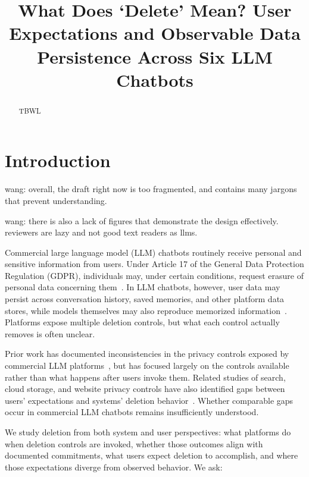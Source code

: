 \documentclass[conference,compsoc]{IEEEtran}
\title{What Does `Delete' Mean? User Expectations and Observable Data Persistence Across Six LLM Chatbots}
\author{\IEEEauthorblockN{Anonymous Author(s)}
\IEEEauthorblockA{Submission \#XXX}}
\newcommand{\xw}[1] {{\color{red}wang: #1}}
\begin{document}
\maketitle

\begin{abstract}
TBWL
\end{abstract}

\section{Introduction}
\label{sec:intro}

\xw{overall, the draft right now is too fragmented, and contains many jargons that prevent understanding.}

\xw{there is also a lack of figures that demonstrate the design effectively. reviewers are lazy and not good text readers as llms.}

Commercial large language model (LLM) chatbots routinely receive personal
and sensitive information from users. Under Article 17 of the General Data
Protection Regulation (GDPR), individuals may, under certain conditions,
request erasure of personal data concerning them~\cite{gdpr2016}. In LLM
chatbots, however, user data may persist across conversation history,
saved memories, and other platform data stores, while models themselves
may also reproduce memorized information~\cite{carlini2021extracting}.
Platforms expose multiple deletion controls, but what each control
actually removes is often unclear.

Prior work has documented inconsistencies in the privacy controls exposed
by commercial LLM platforms~\cite{li2026privacy}, but has focused largely
on the controls available rather than what happens after users invoke
them. Related studies of search, cloud storage, and website privacy
controls have also identified gaps between users' expectations and
systems' deletion behavior~\cite{bertram2019five,kang2015mydata,
ramokapane2017stupid,habib2019empirical}. Whether comparable gaps occur
in commercial LLM chatbots remains insufficiently understood.

We study deletion from both system and user perspectives: what platforms
do when deletion controls are invoked, whether those outcomes align with
documented commitments, what users expect deletion to accomplish, and
where those expectations diverge from observed behavior. We ask:
\end{document}

